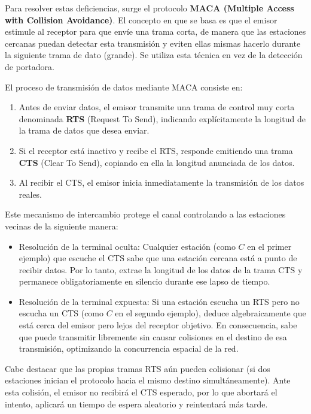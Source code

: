 Para resolver estas deficiencias, surge el protocolo \textbf{MACA (Multiple Access with Collision Avoidance)}. El concepto en que se basa es que el emisor estimule al receptor para que envíe una trama corta, de manera que las estaciones cercanas puedan detectar esta transmisión y
eviten ellas mismas hacerlo durante la siguiente trama de dato (grande). Se utiliza esta técnica en vez de la detección de portadora.

El proceso de transmisión de datos mediante MACA consiste en:

\begin{enumerate}
    \item Antes de enviar datos, el emisor transmite una trama de control muy corta denominada \textbf{RTS} (Request To Send), indicando explícitamente la longitud de la trama de datos que desea enviar.
    \item Si el receptor está inactivo y recibe el RTS, responde emitiendo una trama \textbf{CTS} (Clear To Send), copiando en ella la longitud anunciada de los datos.
    \item Al recibir el CTS, el emisor inicia inmediatamente la transmisión de los datos reales.
\end{enumerate}

Este mecanismo de intercambio protege el canal controlando a las estaciones vecinas de la siguiente manera:
\begin{itemize}
    \item Resolución de la terminal oculta: Cualquier estación (como $C$ en el primer ejemplo) que escuche el CTS sabe que una estación cercana está a punto de recibir datos. Por lo tanto, extrae la longitud de los datos de la trama CTS y permanece obligatoriamente en silencio durante ese lapso de tiempo.
    \item Resolución de la terminal expuesta: Si una estación escucha un RTS pero no escucha un CTS (como $C$ en el segundo ejemplo), deduce algebraicamente que está cerca del emisor pero lejos del receptor objetivo. En consecuencia, sabe que puede transmitir libremente sin causar colisiones en el destino de esa transmisión, optimizando la concurrencia espacial de la red.
\end{itemize}

Cabe destacar que las propias tramas RTS aún pueden colisionar (si dos estaciones inician el protocolo hacia el mismo destino simultáneamente). Ante esta colisión, el emisor no recibirá el CTS esperado, por lo que abortará el intento, aplicará un tiempo de espera aleatorio y reintentará más tarde.

